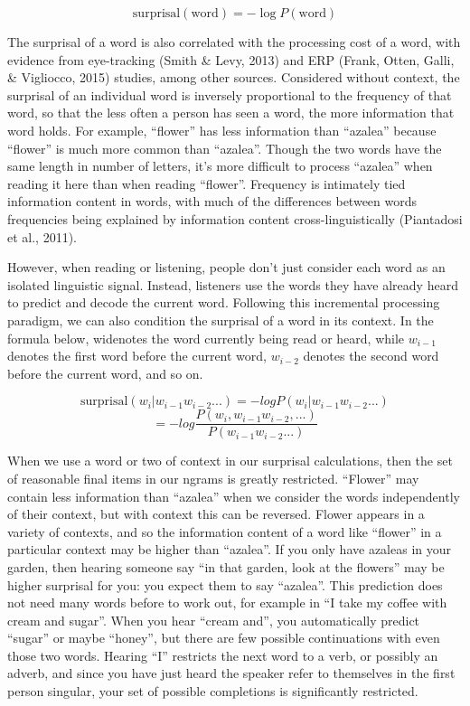 \documentclass[man,floatsintext]{apa6}
\begin{document}
\[\text{surprisal}(\text{word}) = -\log P(\text{word})\]

The surprisal of a word is also correlated with the processing cost of a word, with evidence from eye-tracking (Smith \& Levy, 2013) and ERP (Frank, Otten, Galli, \& Vigliocco, 2015) studies, among other sources. Considered without context, the surprisal of an individual word is inversely proportional to the frequency of that word, so that the less often a person has seen a word, the more information that word holds. For example, \enquote{flower} has less information than \enquote{azalea} because \enquote{flower} is much more common than \enquote{azalea}. Though the two words have the same length in number of letters, it's more difficult to process \enquote{azalea} when reading it here than when reading \enquote{flower}. Frequency is intimately tied information content in words, with much of the differences between words frequencies being explained by information content cross-linguistically (Piantadosi et al., 2011).

However, when reading or listening, people don't just consider each word as an isolated linguistic signal. Instead, listeners use the words they have already heard to predict and decode the current word. Following this incremental processing paradigm, we can also condition the surprisal of a word in its context. In the formula below, widenotes the word currently being read or heard, while \(w_{i-1}\) denotes the first word before the current word, \(w_{i-2}\) denotes the second word before the current word, and so on.

\[\text{surprisal}(w_i|w_{i-1}w_{i-2}...) = -log P(w_i|w_{i-1}w_{i-2}...)\]
\[= -log \frac{P(w_i,w_{i-1}w_{i-2},...)}{P(w_{i-1}w_{i-2}...)}\]

When we use a word or two of context in our surprisal calculations, then the set of reasonable final items in our ngrams is greatly restricted. \enquote{Flower} may contain less information than \enquote{azalea} when we consider the words independently of their context, but with context this can be reversed. Flower appears in a variety of contexts, and so the information content of a word like \enquote{flower} in a particular context may be higher than \enquote{azalea}. If you only have azaleas in your garden, then hearing someone say \enquote{in that garden, look at the flowers} may be higher surprisal for you: you expect them to say \enquote{azalea}. This prediction does not need many words before to work out, for example in \enquote{I take my coffee with cream and sugar}. When you hear \enquote{cream and}, you automatically predict \enquote{sugar} or maybe \enquote{honey}, but there are few possible continuations with even those two words. Hearing \enquote{I} restricts the next word to a verb, or possibly an adverb, and since you have just heard the speaker refer to themselves in the first person singular, your set of possible completions is significantly restricted.
\end{document}
